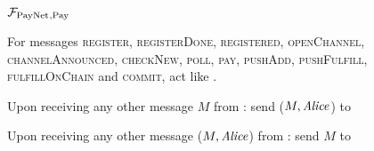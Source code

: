 \begin{figure}[H]
  \begin{systembox}{$\mathcal{F}_{\mathrm{PayNet}}{}_{\mathrm{, Pay}}$}
    \begin{algorithmic}[1]
      \State For messages \textsc{register}, \textsc{registerDone},
      \textsc{registered}, \textsc{openChannel}, \textsc{channelAnnounced},
      \textsc{checkNew}, \textsc{poll}, \textsc{pay}, \textsc{pushAdd},
      \textsc{pushFulfill}, \textsc{fulfillOnChain} and \textsc{commit}, act
      like \fpaynet{}.
      \Statex

      \State Upon receiving any other message $M$ from \alice:
      \Indent
          \State send ($M, \mathit{Alice}$) to \simulator
        \EndIf
      \EndIndent
      \Statex

      \State Upon receiving any other message ($M, \mathit{Alice}$) from \simulator:
      \Indent
          \State send $M$ to \alice
        \EndIf
      \EndIndent
    \end{algorithmic}
  \end{systembox}
  \caption{}
  \label{alg:proof:fpaynet:pay}
\end{figure}


